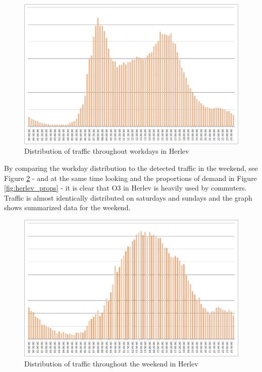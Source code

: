 \begin{figure}[!ht]
\begin{center}
\includegraphics[scale=0.4]{herlev_workday_distribution.png} 
\end{center}
\caption{Distribution of traffic throughout workdays in Herlev}
\label{fig:herlev_commuter}
\end{figure}

By comparing the workday distribution to the detected traffic in the weekend, see Figure \ref{fig:herlev_weekends} - and at the same time looking and the proportions of demand in Figure \ref{fig:herlev_props} - it is clear that O3 in Herlev is heavily used by commuters. Traffic is almost identically distributed on saturdays and sundays and the graph shows summarized data for the weekend.

\begin{figure}[!ht]
\begin{center}
\includegraphics[scale=0.4]{herlev_weekend_distribution.png} 
\end{center}
\caption{Distribution of traffic throughout the weekend in Herlev}
\label{fig:herlev_weekends}
\end{figure}

